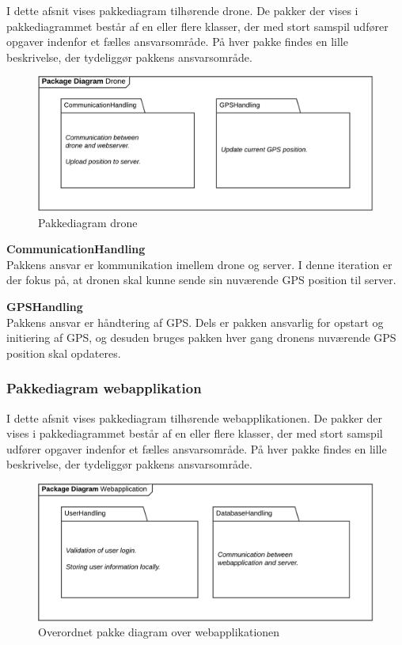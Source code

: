 I dette afsnit vises pakkediagram tilhørende drone. De pakker der vises i pakkediagrammet består af en eller flere klasser, der med stort samspil udfører opgaver indenfor et fælles ansvarsområde. På hver pakke findes en lille beskrivelse, der tydeliggør pakkens ansvarsområde. 


\begin{figure}[H]
	\centering
	\includegraphics[width=1\textwidth]{Billeder/pakke_diagrammer/iteration1_drone.png}
	\vspace{-0.5cm}
	\caption{Pakkediagram drone}
	\label{fig:iteration1_pakke_diagram_drone}
\end{figure}

\textbf{CommunicationHandling}\\
Pakkens ansvar er kommunikation imellem drone og server. I denne iteration er der fokus på, at dronen skal kunne sende sin nuværende GPS position til server.

\textbf{GPSHandling}\\
Pakkens ansvar er håndtering af GPS. Dels er pakken ansvarlig for opstart og initiering af GPS, og desuden bruges pakken hver gang dronens nuværende GPS position skal opdateres.

\newpage
\subsubsection*{Pakkediagram webapplikation}

I dette afsnit vises pakkediagram tilhørende webapplikationen. De pakker der vises i pakkediagrammet består af en eller flere klasser, der med stort samspil udfører opgaver indenfor et fælles ansvarsområde. På hver pakke findes en lille beskrivelse, der tydeliggør pakkens ansvarsområde. 

\begin{figure}[H]
	\centering
	\includegraphics[width=1\textwidth]{Billeder/pakke_diagrammer/iteration1_server.png}
	\vspace{-0.5cm}
	\caption{Overordnet pakke diagram over webapplikationen}
	\label{fig:iteration1_pakke_diagram_webapp}
\end{figure}

